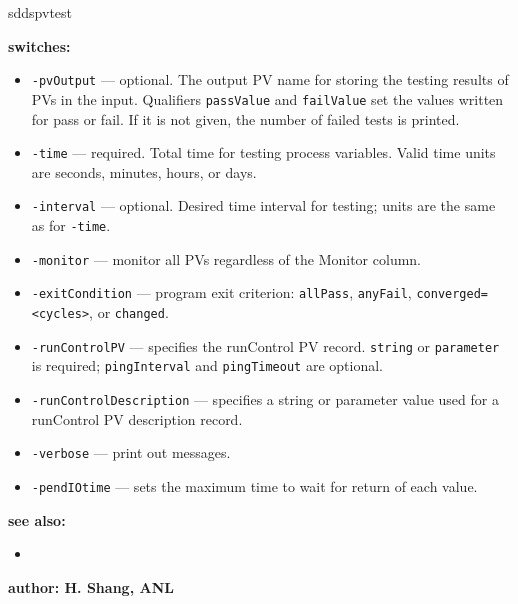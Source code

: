 \begin{sddsprog}{sddspvtest}
\item {\bf switches:}
    \begin{itemize}
        \item {\tt -pvOutput} --- optional. The output PV name for storing the testing results
               of PVs in the input. Qualifiers \verb|passValue| and \verb|failValue| set
               the values written for pass or fail. If it is not given, the number of
               failed tests is printed.
        \item {\tt -time} --- required. Total time for testing process variables.
               Valid time units are seconds, minutes, hours, or days.
        \item {\tt -interval} --- optional. Desired time interval for testing; units are the
               same as for \verb|-time|.
        \item {\tt -monitor} --- monitor all PVs regardless of the Monitor column.
        \item {\tt -exitCondition} --- program exit criterion: \verb|allPass|, \verb|anyFail|,
               \verb|converged=<cycles>|, or \verb|changed|.
        \item {\tt -runControlPV} --- specifies the runControl PV record. \verb|string| or
               \verb|parameter| is required; \verb|pingInterval| and \verb|pingTimeout|
               are optional.
        \item {\tt -runControlDescription} --- specifies a string or parameter value used
               for a runControl PV description record.
        \item {\tt -verbose} --- print out messages.
        \item {\tt -pendIOtime} --- sets the maximum time to wait for return of each value.
    \end{itemize}
\item {\bf see also:}
    \begin{itemize}
    \item {}
    \end{itemize}
\item {\bf author: H. Shang, ANL}
\end{sddsprog}
